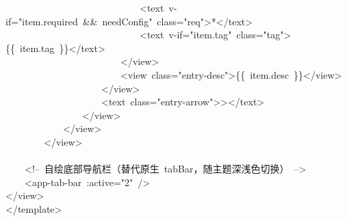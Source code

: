 \documentclass[a4paper,10pt]{article}
\begin{document}
{~~~~~~~~~~~~~~~~~~~~~~~~~~~~<text~v-if="item.required~\&\&~needConfig"~class="req">*</text>\\
~~~~~~~~~~~~~~~~~~~~~~~~~~~~<text~v-if="item.tag"~class="tag">\{\{~item.tag~\}\}</text>\\
~~~~~~~~~~~~~~~~~~~~~~~~</view>\\
~~~~~~~~~~~~~~~~~~~~~~~~<view~class="entry-desc">\{\{~item.desc~\}\}</view>\\
~~~~~~~~~~~~~~~~~~~~</view>\\
~~~~~~~~~~~~~~~~~~~~<text~class="entry-arrow">></text>\\
~~~~~~~~~~~~~~~~</view>\\
~~~~~~~~~~~~</view>\\
~~~~~~~~</view>\\
\mbox{}\\
~~~~<!--~自绘底部导航栏（替代原生~tabBar，随主题深浅色切换）~-->\\
~~~~<app-tab-bar~:active="2"~/>\\
</view>\\
</template>\\
\mbox{}
}

\newpage
\end{document}
